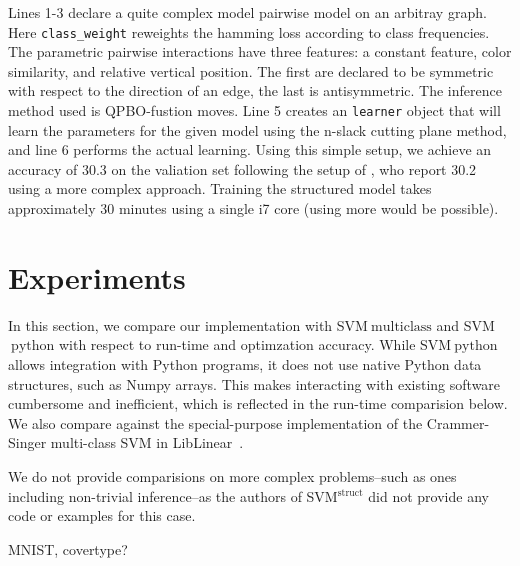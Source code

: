 
Lines 1-3 declare a quite complex model pairwise model on an arbitray graph.
Here \texttt{class\_weight} reweights the hamming loss according to class
frequencies. The parametric pairwise interactions have three features: a
constant feature, color similarity, and relative vertical position. The first
are declared to be symmetric with respect to the direction of an edge, the last
is antisymmetric. The inference method used is QPBO-fustion moves.  Line 5
creates an \texttt{learner} object that will learn the parameters for the given
model using the n-slack cutting plane method, and line 6 performs the actual
learning.  Using this simple setup, we achieve an accuracy of 30.3 on the
valiation set following the setup of \citet{krahenbuhl2012efficient}, who
report 30.2 using a more complex approach. Training the structured model takes
approximately 30 minutes using a single i7 core (using more would be possible).


\section{Experiments}\label{sec:benchmarks}
In this section, we compare our implementation with SVM$~\text{multiclass}$ and
SVM$~\text{python}$ with respect to run-time and optimzation accuracy.
While SVM$~\text{python}$ allows integration with Python programs, it does not use native
Python data structures, such as Numpy arrays. This makes interacting with existing software
cumbersome and inefficient, which is reflected in the run-time comparision below.
We also compare against the special-purpose implementation of the Crammer-Singer multi-class SVM in
{\sc LibLinear}~\citep{fan2008liblinear}.

We do not provide comparisions on more complex problems--such as ones including
non-trivial inference--as the authors of SVM$^\text{struct}$ did not provide
any code or examples for this case.

MNIST, covertype?



